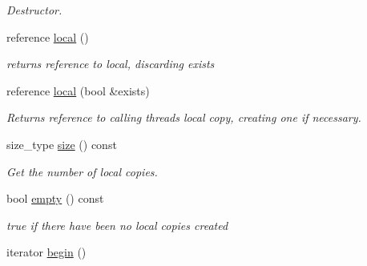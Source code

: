 \begin{DoxyCompactItemize}
\begin{DoxyCompactList}\small\item\em Destructor. \end{DoxyCompactList}\item 
\hypertarget{classtbb_1_1interface6_1_1enumerable__thread__specific_aea846c6cbafbe2ff6bde6e8c2a2ee97e}{}reference \hyperlink{classtbb_1_1interface6_1_1enumerable__thread__specific_aea846c6cbafbe2ff6bde6e8c2a2ee97e}{local} ()\label{classtbb_1_1interface6_1_1enumerable__thread__specific_aea846c6cbafbe2ff6bde6e8c2a2ee97e}

\begin{DoxyCompactList}\small\item\em returns reference to local, discarding exists \end{DoxyCompactList}\item 
\hypertarget{classtbb_1_1interface6_1_1enumerable__thread__specific_abbbc24a5816dc163d5df057c5e7f379d}{}reference \hyperlink{classtbb_1_1interface6_1_1enumerable__thread__specific_abbbc24a5816dc163d5df057c5e7f379d}{local} (bool \&exists)\label{classtbb_1_1interface6_1_1enumerable__thread__specific_abbbc24a5816dc163d5df057c5e7f379d}

\begin{DoxyCompactList}\small\item\em Returns reference to calling thread\textquotesingle{}s local copy, creating one if necessary. \end{DoxyCompactList}\item 
\hypertarget{classtbb_1_1interface6_1_1enumerable__thread__specific_a4c33c5390783e17daf2b25d53ae919fb}{}size\+\_\+type \hyperlink{classtbb_1_1interface6_1_1enumerable__thread__specific_a4c33c5390783e17daf2b25d53ae919fb}{size} () const \label{classtbb_1_1interface6_1_1enumerable__thread__specific_a4c33c5390783e17daf2b25d53ae919fb}

\begin{DoxyCompactList}\small\item\em Get the number of local copies. \end{DoxyCompactList}\item 
\hypertarget{classtbb_1_1interface6_1_1enumerable__thread__specific_adfa4b2e13e47ab825dc40c4f195d2bc5}{}bool \hyperlink{classtbb_1_1interface6_1_1enumerable__thread__specific_adfa4b2e13e47ab825dc40c4f195d2bc5}{empty} () const \label{classtbb_1_1interface6_1_1enumerable__thread__specific_adfa4b2e13e47ab825dc40c4f195d2bc5}

\begin{DoxyCompactList}\small\item\em true if there have been no local copies created \end{DoxyCompactList}\item 
\hypertarget{classtbb_1_1interface6_1_1enumerable__thread__specific_a070d26debf1f65c83de13f64f91aefdc}{}iterator \hyperlink{classtbb_1_1interface6_1_1enumerable__thread__specific_a070d26debf1f65c83de13f64f91aefdc}{begin} ()\label{classtbb_1_1interface6_1_1enumerable__thread__specific_a070d26debf1f65c83de13f64f91aefdc}


\end{DoxyCompactItemize}
